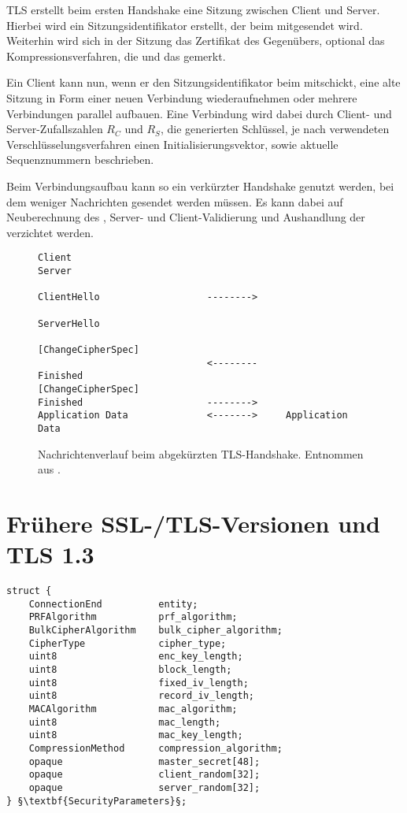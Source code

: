 
TLS erstellt beim ersten Handshake eine Sitzung zwischen Client und Server. Hierbei wird ein Sitzungsidentifikator erstellt, der beim \serverhello{} mitgesendet wird. Weiterhin wird sich in der Sitzung das Zertifikat des Gegenübers, optional das Kompressionsverfahren, die \ciphersuite und das \mastersecret{} gemerkt.

Ein Client kann nun, wenn er den Sitzungsidentifikator beim \clienthello{} mitschickt, eine alte Sitzung in Form einer neuen Verbindung wiederaufnehmen oder mehrere Verbindungen parallel aufbauen. Eine Verbindung wird dabei durch Client- und Server-Zufallszahlen \(R_C\) und \(R_S\), die generierten Schlüssel, je nach verwendeten Verschlüsselungsverfahren einen Initialisierungsvektor, sowie aktuelle Sequenznummern beschrieben.

Beim Verbindungsaufbau kann so ein verkürzter Handshake genutzt werden, bei dem weniger Nachrichten gesendet werden müssen. Es kann dabei auf Neuberechnung des \mastersecret{}, Server- und Client-Validierung und Aushandlung der \ciphersuite{} verzichtet werden.

\begin{figure}[]%
	\centering
	\begin{lstlisting}
Client                                                Server

ClientHello                   -------->
                                                 ServerHello
                                          [ChangeCipherSpec]
                              <--------             Finished
[ChangeCipherSpec]
Finished                      -------->
Application Data              <------->     Application Data
	\end{lstlisting}
	\caption{Nachrichtenverlauf beim abgekürzten TLS-Handshake. Entnommen aus \cite{tls12}.}
	\label{fig_abbreviated_handshake}
\end{figure}





\section{Frühere SSL-/TLS-Versionen und TLS 1.3}



\begin{lstlisting}
struct {
	ConnectionEnd          entity;
	PRFAlgorithm           prf_algorithm;
	BulkCipherAlgorithm    bulk_cipher_algorithm;
	CipherType             cipher_type;
	uint8                  enc_key_length;
	uint8                  block_length;
	uint8                  fixed_iv_length;
	uint8                  record_iv_length;
	MACAlgorithm           mac_algorithm;
	uint8                  mac_length;
	uint8                  mac_key_length;
	CompressionMethod      compression_algorithm;
	opaque                 master_secret[48];
	opaque                 client_random[32];
	opaque                 server_random[32];
} §\textbf{SecurityParameters}§;
\end{lstlisting}

